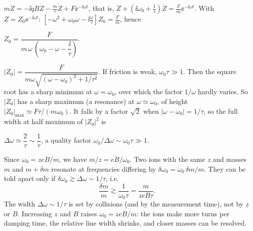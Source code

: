 \documentclass[11pt,a4paper]{article}
\begin{document}
$m\ddot Z = -\ii qB\dot Z - \frac m\tau\dot Z + F\ee^{-\ii\omega t}$, that is,
$\ddot Z + \left(\ii\omega_0 + \frac1\tau\right)\dot Z = \frac Fm\ee^{-\ii\omega t}$. With
$Z = Z_0\ee^{-\ii\omega t}$:
$\left[-\omega^2 + \omega_0\omega - \ii\frac\omega\tau\right]Z_0 = \frac Fm$, hence
\begin{result}
$Z_0 = \dfrac{F}{m\,\omega\,\left(\omega_0 - \omega - \dfrac{\ii}{\tau}\right)}.$
\end{result}

$|Z_0| = \dfrac{F}{m\omega\sqrt{(\omega-\omega_0)^2 + 1/\tau^2}}$. If friction is weak,
$\omega_0\tau\gg1$. Then the square root has a sharp minimum at $\omega = \omega_0$, over which
the factor $1/\omega$ hardly varies. So $|Z_0|$ has a sharp maximum (a resonance) at
$\omega\simeq\omega_0$, of height $|Z_0|_{\max}\simeq F\tau/(m\omega_0)$. It falls by a factor
$\sqrt2$ when $|\omega-\omega_0| = 1/\tau$, so the full width at half maximum of $|Z_0|^2$ is
\begin{result}
$\Delta\omega\simeq\dfrac2\tau\sim\dfrac1\tau$, \quad a quality factor
$\omega_0/\Delta\omega\sim\omega_0\tau\gg1$.
\end{result}
\begin{center}
\end{center}

Since $\omega_0 = zeB/m$, we have $m/z = eB/\omega_0$. Two ions with the same $z$ and masses $m$
and $m+\delta m$ resonate at frequencies differing by $\delta\omega_0 = \omega_0\,\delta m/m$.
They can be told apart only if $\delta\omega_0\gtrsim\Delta\omega\sim1/\tau$, i.e.
\[
  \frac{\delta m}{m}\gtrsim\frac1{\omega_0\tau} = \frac{m}{zeB\tau}.
\]
The width $\Delta\omega\sim1/\tau$ is set by collisions (and by the measurement time), not by
$z$ or $B$. Increasing $z$ and $B$ raises $\omega_0 = zeB/m$: the ions make more turns per
damping time, the relative line width shrinks, and closer masses can be resolved.
\end{document}
